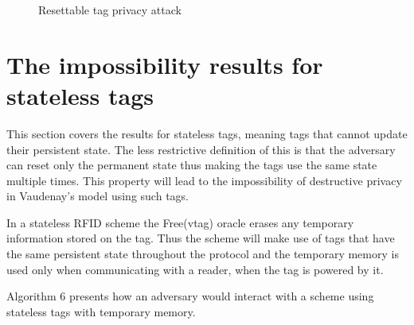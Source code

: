     \begin{figure}[H]
    \hspace*{0.5cm}
    \caption{Resettable tag privacy attack}
    \end{figure}

\section{The impossibility results for stateless tags}

    This section covers the results for stateless tags, meaning tags that cannot update their persistent state. The less restrictive definition of this is that
    the adversary can reset only the permanent state thus making the tags use the same state multiple times. This property will lead to the 
    impossibility of destructive privacy in Vaudenay's model using such tags. 

    In a stateless RFID scheme the Free(vtag) oracle erases any temporary information stored on the tag. Thus the scheme will make use of tags that have the same
    persistent state throughout the protocol and the temporary memory is used only when communicating with a reader, when the tag is powered by it.

    Algorithm 6 presents how an adversary would interact with a scheme using stateless tags with temporary memory.

